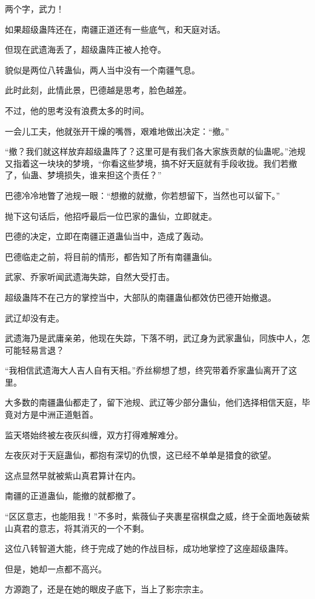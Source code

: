 \begin{this_body}
两个字，武力！

如果超级蛊阵还在，南疆正道还有一些底气，和天庭对话。

但现在武遗海丢了，超级蛊阵正被人抢夺。

貌似是两位八转蛊仙，两人当中没有一个南疆气息。

此时此刻，此情此景，巴德越是思考，脸色越差。

不过，他的思考没有浪费太多的时间。

一会儿工夫，他就张开干燥的嘴唇，艰难地做出决定：“撤。”

“撤？我们就这样放弃超级蛊阵了？这里可是有我们各大家族贡献的仙蛊呢。”池规又指着这一块块的梦境，“你看这些梦境，搞不好天庭就有手段收拢。我们若撤了，仙蛊、梦境损失，谁来担这个责任？”

巴德冷冷地瞥了池规一眼：“想撤的就撤，你若想留下，当然也可以留下。”

抛下这句话后，他招呼最后一位巴家的蛊仙，立即就走。

巴德的决定，立即在南疆正道蛊仙当中，造成了轰动。

巴德临走之前，将目前的情形，都告知了所有南疆蛊仙。

武家、乔家听闻武遗海失踪，自然大受打击。

超级蛊阵不在己方的掌控当中，大部队的南疆蛊仙都效仿巴德开始撤退。

武辽却没有走。

武遗海乃是武庸亲弟，他现在失踪，下落不明，武辽身为武家蛊仙，同族中人，怎可能轻易言退？

“我相信武遗海大人吉人自有天相。”乔丝柳想了想，终究带着乔家蛊仙离开了这里。

大多数的南疆蛊仙都走了，留下池规、武辽等少部分蛊仙，他们选择相信天庭，毕竟对方是中洲正道魁首。

监天塔始终被左夜灰纠缠，双方打得难解难分。

左夜灰对于天庭蛊仙，都抱有深切的仇恨，这已经不单单是猎食的欲望。

这点显然早就被紫山真君算计在内。

南疆的正道蛊仙，能撤的就都撤了。

“区区意志，也能阻我！”不多时，紫薇仙子夹裹星宿棋盘之威，终于全面地轰破紫山真君的意志，将其消灭的一个不剩。

这位八转智道大能，终于完成了她的作战目标，成功地掌控了这座超级蛊阵。

但是，她却一点都不高兴。

方源跑了，还是在她的眼皮子底下，当上了影宗宗主。


\end{this_body}
